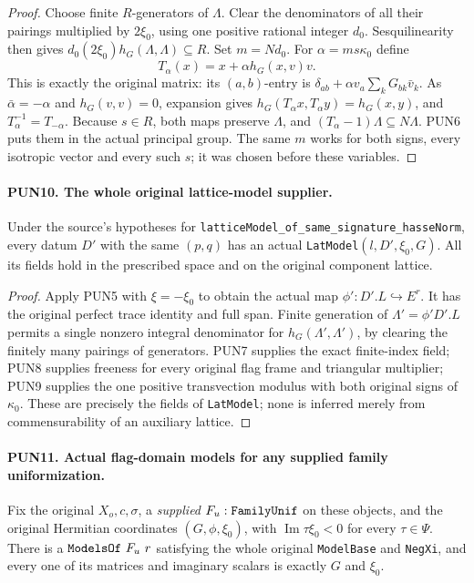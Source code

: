\documentclass[11pt,a4paper]{article}
\numberwithin{equation}{section}
\theoremstyle{remark}\newtheorem{remark}[theorem]{Remark}
\begin{document}
\begin{proof}
Choose finite \(R\)-generators of \(\Lambda\).  Clear the
denominators of all their pairings multiplied by \(2\xi_0\),
using one positive rational integer \(d_0\).  Sesquilinearity
then gives
\(d_0(2\xi_0)h_G(\Lambda,\Lambda)\subseteq R\).
Set \(m=N d_0\).  For \(\alpha=ms\kappa_0\) define
\[
        T_\alpha(x)=x+\alpha h_G(x,v)v.
 \tag{PUN.10}
\]
This is exactly the original matrix: its \((a,b)\)-entry is
\(\delta_{ab}+\alpha v_a\sum_kG_{bk}\bar v_k\).
As \(\bar\alpha=-\alpha\) and \(h_G(v,v)=0\), expansion
gives \(h_G(T_\alpha x,T_\alpha y)=h_G(x,y)\), and
\(T_\alpha^{-1}=T_{-\alpha}\).  Because \(s\in R\), both
maps preserve \(\Lambda\), and
\((T_\alpha-1)\Lambda\subseteq N\Lambda\).
PUN6 puts them in the actual principal group.  The same \(m\)
works for both signs, every isotropic vector and every such \(s\);
it was chosen before these variables.
\end{proof}

\paragraph{PUN10. The whole original lattice-model supplier.}
\label{claim:PUN10}
Under the source's hypotheses for
\texttt{lattice\allowbreak Model\_\allowbreak of\_\allowbreak same\_\allowbreak signature\_\allowbreak hasse\allowbreak Norm}, every
datum \(D'\) with the same \((p,q)\) has an actual
\texttt{Lat\allowbreak Model}\((l,D',\xi_0,G)\).  All its fields hold in
the prescribed space and on the original component lattice.

\begin{proof}
Apply PUN5 with \(\xi=-\xi_0\) to obtain the actual map
\(\phi':D'.L\hookrightarrow E^r\).  It has the original
perfect trace identity and full span.  Finite generation of
\(\Lambda'=\phi'D'.L\) permits a single nonzero integral
denominator for \(h_G(\Lambda',\Lambda')\), by clearing the
finitely many pairings of generators.  PUN7 supplies the exact
finite-index field; PUN8 supplies freeness for every original
flag frame and triangular multiplier; PUN9 supplies the one
positive transvection modulus with both original signs of
\(\kappa_0\).  These are precisely the fields of
\texttt{Lat\allowbreak Model}; none is inferred merely from commensurability
of an auxiliary lattice.
\end{proof}

\paragraph{PUN11. Actual flag-domain models for any supplied family uniformization.}
\label{claim:PUN11}
Fix the original \(X_o,c,\sigma\), a \emph{supplied}
\(F_u:\texttt{Family\allowbreak Unif}\) on these objects, and the original
Hermitian coordinates \((G,\phi,\xi_0)\), with
\(\operatorname{Im}\tau\xi_0<0\) for every \(\tau\in\Psi\).
There is a \(\texttt{Models\allowbreak Of}\ F_u\ r\) satisfying the
whole original \texttt{Model\allowbreak Base} and \texttt{Neg\allowbreak Xi}, and every
one of its matrices and imaginary scalars is exactly \(G\) and
\(\xi_0\).
\end{document}
